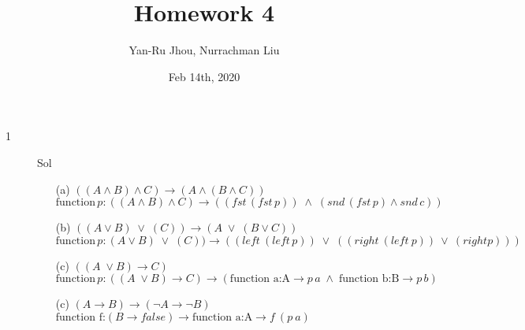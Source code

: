 \documentclass{article}
\title{Homework 4}
\author{Yan-Ru Jhou, Nurrachman Liu}
\date{Feb 14th, 2020}
\begin{document}
    \maketitle

    \begin{description}
        \item[1]{Sol}\\
            \begin{enumerate}
                \item[(a)] { $((A \wedge B) \wedge C) \rightarrow ( A \wedge ( B \wedge C) )$}\\
                    $ \text{function}\, p:((A \wedge B) \wedge C) \rightarrow ( (fst\,(fst\,p))\; \wedge\; (snd\,(fst\,p) \wedge snd\,c) ) $
                \item[(b)] {$((A \vee B)\; \vee \; (C))  \rightarrow ( A \; \vee \; (B \vee C))$ }\\
                    $\text{function}\, p:(A \vee B)\; \vee \; (C))  \rightarrow ((left \: (left\, p)) \; \vee \; ( (right \: (left \: p))  \: \vee \: ( right p) ) )  $
                \item[(c)]{$((A \; \vee B) \longrightarrow C)$}\\
                    $\text{function}\, p:((A \; \vee B) \rightarrow C) \longrightarrow (\text{function a:A} \rightarrow p \, a \; \wedge\; \text{function b:B}\rightarrow p \, b )$
                \item[(c)] {$(A \rightarrow B) \longrightarrow (\neg A \rightarrow \neg B)$}
                    $\text{function f:}(B \rightarrow false) \longrightarrow \text{function a:A} \longrightarrow f\: (p\: a)$
            \end{enumerate}


\end{description}
\end{document}
